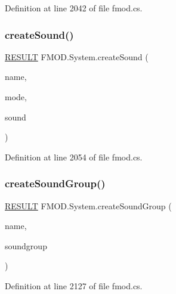 Definition at line 2042 of file fmod.\+cs.

\mbox{\label{class_f_m_o_d_1_1_system_a5bdad80b7418931d45cbfe97930aa9bb}} 
\subsubsection{\texorpdfstring{create\+Sound()}{createSound()}\hspace{0.1cm}{\footnotesize\ttfamily [3/3]}}
{\footnotesize\ttfamily \hyperlink{namespace_f_m_o_d_a305d1176ef3f8c8815861a60407ac33d}{R\+E\+S\+U\+LT} F\+M\+O\+D.\+System.\+create\+Sound (\begin{DoxyParamCaption}\item[{string}]{name,  }\item[{\hyperlink{namespace_f_m_o_d_a94ab158a8314f5f4248f1aea55dbefa3}{M\+O\+DE}}]{mode,  }\item[{out \hyperlink{class_f_m_o_d_1_1_sound}{Sound}}]{sound }\end{DoxyParamCaption})}



Definition at line 2054 of file fmod.\+cs.

\mbox{\label{class_f_m_o_d_1_1_system_a6baf311b84ce5130639c287670b1ef41}} 
\subsubsection{\texorpdfstring{create\+Sound\+Group()}{createSoundGroup()}}
{\footnotesize\ttfamily \hyperlink{namespace_f_m_o_d_a305d1176ef3f8c8815861a60407ac33d}{R\+E\+S\+U\+LT} F\+M\+O\+D.\+System.\+create\+Sound\+Group (\begin{DoxyParamCaption}\item[{string}]{name,  }\item[{out \hyperlink{class_f_m_o_d_1_1_sound_group}{Sound\+Group}}]{soundgroup }\end{DoxyParamCaption})}



Definition at line 2127 of file fmod.\+cs.

